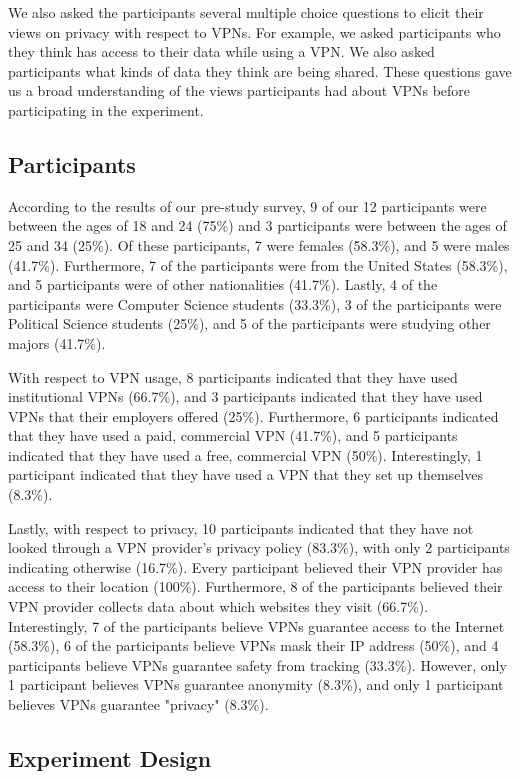We also asked the participants several multiple choice questions to elicit their views on privacy with respect to VPNs.
For example, we asked participants who they think has access to their data while using a VPN.
We also asked participants what kinds of data they think are being shared.
These questions gave us a broad understanding of the views participants had about VPNs before participating in the experiment.

\subsection{Participants} 
According to the results of our pre-study survey, 9 of our 12 participants were between the ages of 18 and 24 (75\%) and 3 participants were between the ages of 25 and 34 (25\%).
Of these participants, 7 were females (58.3\%), and 5 were males (41.7\%).
Furthermore, 7 of the participants were from the United States (58.3\%), and 5 participants were of other nationalities (41.7\%). 
Lastly, 4 of the participants were Computer Science students (33.3\%), 3 of the participants were Political Science students (25\%), and 5 of the participants were studying other majors (41.7\%).

With respect to VPN usage, 8 participants indicated that they have used institutional VPNs (66.7\%), and 3 participants indicated that they have used VPNs that their employers offered (25\%).
Furthermore, 6 participants indicated that they have used a paid, commercial VPN (41.7\%), and 5 participants indicated that they have used a free, commercial VPN (50\%).
Interestingly, 1 participant indicated that they have used a VPN that they set up themselves (8.3\%).

Lastly, with respect to privacy, 10 participants indicated that they have not looked through a VPN provider's privacy policy (83.3\%), with only 2 participants indicating otherwise (16.7\%).
Every participant believed their VPN provider has access to their location (100\%).
Furthermore, 8 of the participants believed their VPN provider collects data about which websites they visit (66.7\%).
Interestingly, 7 of the participants believe VPNs guarantee access to the Internet (58.3\%), 6 of the participants believe VPNs mask their IP address (50\%), and 4 participants believe VPNs guarantee safety from tracking (33.3\%).
However, only 1 participant believes VPNs guarantee anonymity (8.3\%), and only 1 participant believes VPNs guarantee "privacy" (8.3\%).
 
\subsection{Experiment Design}
